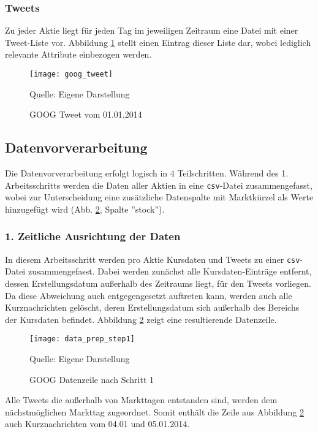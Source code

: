 \subsubsection*{Tweets}\label{sec:data_ingestion_tweetdata}
Zu jeder Aktie liegt für jeden Tag im jeweiligen Zeitraum eine Datei mit einer Tweet-Liste vor. Abbildung \ref{fig:goog_tweet} stellt einen Eintrag dieser Liste dar, wobei lediglich relevante Attribute einbezogen werden.
\begin{figure}[H]
	\caption{GOOG Tweet vom 01.01.2014}
	\texttt{[image: goog\_tweet]}
	\label{fig:goog_tweet}
	\raggedright
	\normalsize{Quelle: Eigene Darstellung}
	\vspace{-1.0em}
\end{figure}


\subsection{Datenvorverarbeitung}\label{sec:data_prep}

Die Datenvorverarbeitung erfolgt logisch in $4$ Teilschritten. Während des 1. Arbeitsschritts werden die Daten aller Aktien in eine \texttt{csv}-Datei zusammengefasst, wobei zur Unterscheidung eine zusätzliche Datenspalte mit Marktkürzel als Werte hinzugefügt wird (Abb. \ref{fig:data_prep_step1}, Spalte ''stock'').

\subsubsection*{1. Zeitliche Ausrichtung der Daten}

In diesem Arbeitsschritt werden pro Aktie Kursdaten und Tweets zu einer \texttt{csv}-Datei zusammengefasst. Dabei werden zunächst alle Kursdaten-Einträge entfernt, dessen Erstellungsdatum außerhalb des Zeitraums liegt, für den Tweets vorliegen. Da diese Abweichung auch entgegengesetzt auftreten kann, werden auch alle Kurznachrichten gelöscht, deren Erstellungsdatum sich außerhalb des Bereichs der Kursdaten befindet. Abbildung \ref{fig:data_prep_step1} zeigt eine resultierende Datenzeile.
\begin{figure}[H]
	\caption{GOOG Datenzeile nach Schritt 1}
	\texttt{[image: data\_prep\_step1]}
	\label{fig:data_prep_step1}
	\raggedright
	\normalsize{Quelle: Eigene Darstellung}
	\vspace{-1.0em}
\end{figure}
Alle Tweets die außerhalb von Markttagen entstanden sind, werden dem nächstmöglichen Markttag zugeordnet. Somit enthält die Zeile aus Abbildung \ref{fig:data_prep_step1} auch Kurznachrichten vom 04.01 und 05.01.2014. 


